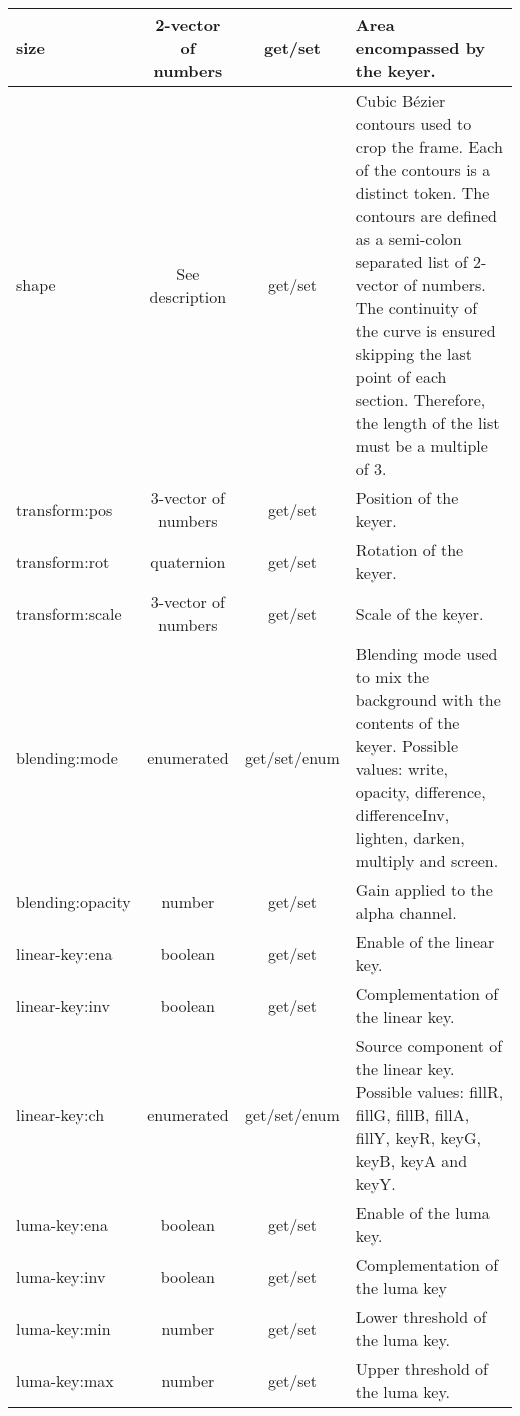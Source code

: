 \documentclass[../main.tex]{subfiles}
\begin{document}
\begin{landscape}
\begin{longtable}{|l|c|c|p{12cm}|}
    size & 2-vector of numbers & get/set & Area encompassed by the keyer. \\\hline
    shape & See description & get/set & Cubic Bézier contours used to crop the frame. Each of the contours is a distinct token. The contours are defined as a semi-colon separated list of 2-vector of numbers. The continuity of the curve is ensured skipping the last point of each section. Therefore, the length of the list must be a multiple of 3. \\\hline
    
    transform:pos & 3-vector of numbers & get/set & Position of the keyer. \\\hline
    transform:rot & quaternion & get/set & Rotation of the keyer. \\\hline
    transform:scale & 3-vector of numbers & get/set & Scale of the keyer. \\\hline
    
    blending:mode & enumerated & get/set/enum & Blending mode used to mix the background with the contents of the keyer. Possible values: write, opacity, difference, differenceInv, lighten, darken, multiply and screen. \\\hline
    blending:opacity & number & get/set & Gain applied to the alpha channel. \\\hline
    
    linear-key:ena & boolean & get/set & Enable of the linear key. \\\hline
    linear-key:inv & boolean & get/set & Complementation of the linear key. \\\hline
    linear-key:ch & enumerated & get/set/enum & Source component of the linear key. Possible values: fillR, fillG, fillB, fillA, fillY, keyR, keyG, keyB, keyA and keyY. \\\hline
    
    luma-key:ena & boolean & get/set & Enable of the luma key. \\\hline
    luma-key:inv & boolean & get/set & Complementation of the luma key \\\hline
    luma-key:min & number & get/set & Lower threshold of the luma key. \\\hline
    luma-key:max & number & get/set & Upper threshold of the luma key. \\\hline
    

\end{longtable}
\end{landscape}
\end{document}
